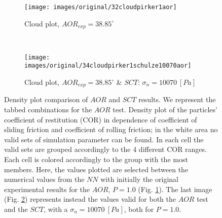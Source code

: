 \begin{figure}[htp] \centering
    \begin{subfigure}[b]{0.96\columnwidth}
        \texttt{[image: images/original/32cloudpirker1aor]}
        \caption{Cloud plot, $AOR_{exp} = 38.85 ^\circ$}
        \label{fig:32cloudpirker1aor} 
    \end{subfigure}\\
    \begin{subfigure}[b]{0.96\columnwidth}
        \texttt{[image: images/original/34cloudpirker1schulze10070aor]}
        \caption{Cloud plot, $AOR_{exp} = 38.85
        ^\circ$ \& $SCT$: $\sigma_n=10070 ~[Pa]$}
        \label{fig:34cloudpirker1schulze10070aor} 
    \end{subfigure}
    \caption[Density plot comparison of AOR and SCT results]{Density plot
    comparison of $AOR$ and $SCT$ results. We represent the tabbed combinations for the
    $AOR$ test.
    Density plot of the particles' coefficient of restitution (COR) in dependence
	of coefficient of sliding friction and coefficient of rolling friction; in the
	white area no valid sets of simulation parameter can be found.
	In each cell the valid sets are grouped accordingly to the 4 different COR
	ranges.
	Each cell is colored accordingly to the group with the most members. 
    Here, the values plotted are selected between the numerical
    values from the $NN$ with initially the original experimental results for
    the $AOR$, $P=1.0$ (Fig.
    \ref{fig:32cloudpirker1aor}). 
    The last image (Fig. \ref{fig:34cloudpirker1schulze10070aor}) represents
    instead the values valid for both the $AOR$ test and the $SCT$, with a
    $\sigma_n=10070 ~[Pa]$, both for $P=1.0$. }
    \label{fig:35schulze10070aorradarandcloud}
\end{figure}
